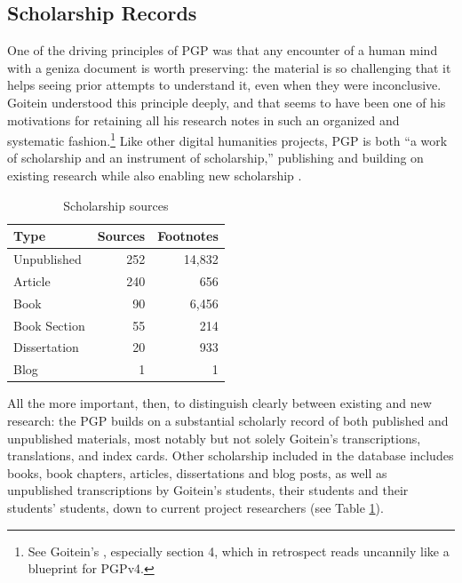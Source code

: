 \documentclass{article}
\begin{document}
\subsection{Scholarship Records}

One of the driving principles of PGP was that any encounter of a human mind with a geniza document is worth preserving: the material is so challenging that it helps seeing prior attempts to understand it, even when they were inconclusive. Goitein understood this principle deeply, and that seems to have been one of his motivations for retaining all his research notes in such an organized and systematic fashion.\footnote{See Goitein's , especially section 4, which in retrospect reads uncannily like a blueprint for PGPv4.} Like other digital humanities projects, PGP is both “a work of scholarship and an instrument of scholarship,” publishing and building on existing research while also enabling new scholarship \autocite[2]{kotin_world_2024}.

\begin{table}
\caption{Scholarship sources}
\label{table:scholarship_sources}
\begin{tabular}{lrr}
\toprule
Type & Sources & Footnotes \\
\midrule
Unpublished & 252 & 14,832 \\
Article & 240 & 656 \\
Book & 90 & 6,456 \\
Book Section & 55 & 214 \\
Dissertation & 20 & 933 \\
Blog & 1 & 1 \\
\bottomrule
\end{tabular}
\end{table}
All the more important, then, to distinguish clearly between existing and new research: the PGP builds on a substantial scholarly record of both published and unpublished materials, most notably but not solely Goitein’s transcriptions, translations, and index cards. Other scholarship included in the database includes books, book chapters, articles, dissertations and blog posts, as well as unpublished transcriptions by Goitein’s students, their students and their students’ students, down to current project researchers (see Table \ref{table:scholarship_sources}). 
\end{document}

